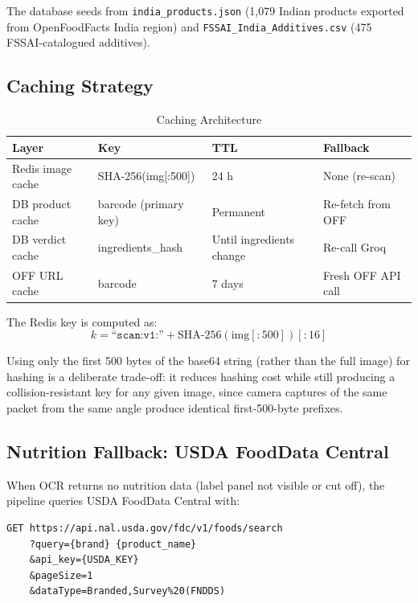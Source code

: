 \documentclass[conference]{IEEEtran}
\begin{document}
\noindent The database seeds from \texttt{india\_products.json} (1,079 Indian products
exported from OpenFoodFacts India region) and \texttt{FSSAI\_India\_Additives.csv}
(475 FSSAI-catalogued additives).

\subsection{Caching Strategy}

\begin{table}[ht]
\caption{Caching Architecture}
\label{tab:cache}
\begin{center}
\footnotesize
\begin{tabular}{|l|l|l|l|}
\hline
\textbf{Layer} & \textbf{Key} & \textbf{TTL} & \textbf{Fallback} \\
\hline
Redis image cache   & SHA-256(img[:500]) & 24 h & None (re-scan) \\
DB product cache    & barcode (primary key) & Permanent & Re-fetch from OFF \\
DB verdict cache    & ingredients\_hash & Until ingredients change & Re-call Groq \\
OFF URL cache       & barcode & 7 days & Fresh OFF API call \\
\hline
\end{tabular}
\end{center}
\end{table}

The Redis key is computed as:
\begin{equation}
k = \texttt{``scan:v1:''} + \text{SHA-256}(\text{img}[{:}500])[:16]
\label{eq:cache_key}
\end{equation}

Using only the first 500 bytes of the base64 string (rather than the full image)
for hashing is a deliberate trade-off: it reduces hashing cost while still producing
a collision-resistant key for any given image, since camera captures of the same
packet from the same angle produce identical first-500-byte prefixes.

\subsection{Nutrition Fallback: USDA FoodData Central}

When OCR returns no nutrition data (label panel not visible or cut off), the
pipeline queries USDA FoodData Central \cite{usda_fdc} with:

\begin{small}
\begin{verbatim}
GET https://api.nal.usda.gov/fdc/v1/foods/search
    ?query={brand} {product_name}
    &api_key={USDA_KEY}
    &pageSize=1
    &dataType=Branded,Survey%20(FNDDS)
\end{verbatim}
\end{small}
\end{document}
